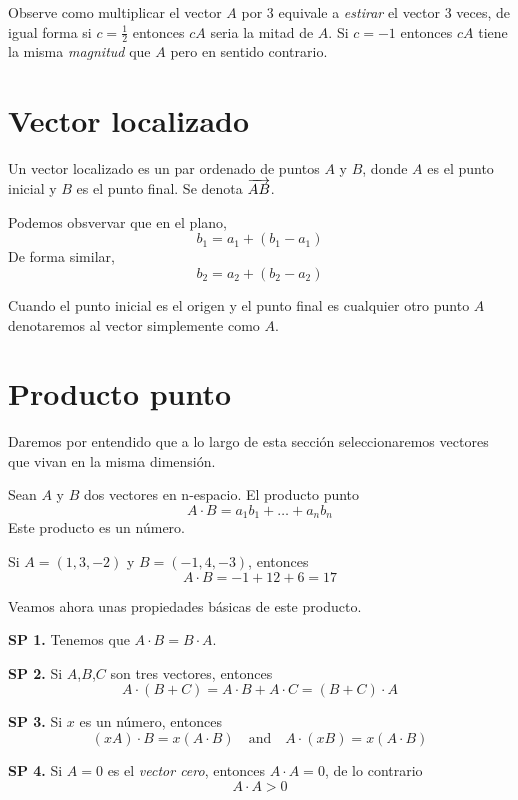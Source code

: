 Observe como multiplicar el vector $A$ por $3$ equivale a \emph{estirar} el vector $3$ veces, de igual forma
si $c=\frac{1}{2}$ entonces $cA$ seria la mitad de $A$. Si $c=-1$ entonces $cA$ tiene la misma \emph{magnitud}
que $A$ pero en sentido contrario.

\section{Vector localizado}

\begin{definition}
    Un vector localizado es un par ordenado de puntos $A$ y $B$, donde $A$ es el punto inicial y $B$ es el punto final. Se
    denota $\overrightarrow{AB}$.
\end{definition}

Podemos obsvervar que en el plano,
$$ b_{1} = a_{1} + (b_{1} - a_{1}) $$
De forma similar,
$$ b_{2} = a_{2} + (b_{2} - a_{2}) $$

Cuando el punto inicial es el origen y el punto final es cualquier otro punto $A$ denotaremos al vector simplemente como $A$.

\section{Producto punto}

Daremos por entendido que a lo largo de esta sección seleccionaremos vectores que vivan en la misma dimensión.

\begin{definition}
    Sean $A$ y $B$ dos vectores en n-espacio. El producto punto
    $$ A \cdot B = a_{1}b_{1} + \ldots + a_{n}b_{n} $$
    Este producto es un número.
\end{definition}

\begin{myExample}
    Si $A=(1,3,-2)$ y $B=(-1,4,-3)$, entonces
    $$ A \cdot B = -1 + 12 + 6 = 17 $$
\end{myExample}

Veamos ahora unas propiedades básicas de este producto.

\begin{labeling}{}
    \item [\textbf{SP 1.}] Tenemos que $A \cdot B = B \cdot A$.
    \item [\textbf{SP 2.}] Si $A$,$B$,$C$ son tres vectores, entonces
        $$ A \cdot (B+C) = A \cdot B + A \cdot C = (B+C) \cdot A$$
    \item [\textbf{SP 3.}] Si $x$ es un número, entonces
        $$ (xA) \cdot B = x(A \cdot B) \quad \text{and} \quad A \cdot (xB) = x(A \cdot B) $$ 
    \item [\textbf{SP 4.}] Si $A=0$ es el \emph{vector cero}, entonces $A \cdot A = 0$, de lo contrario
        $$ A \cdot A > 0 $$
\end{labeling}

